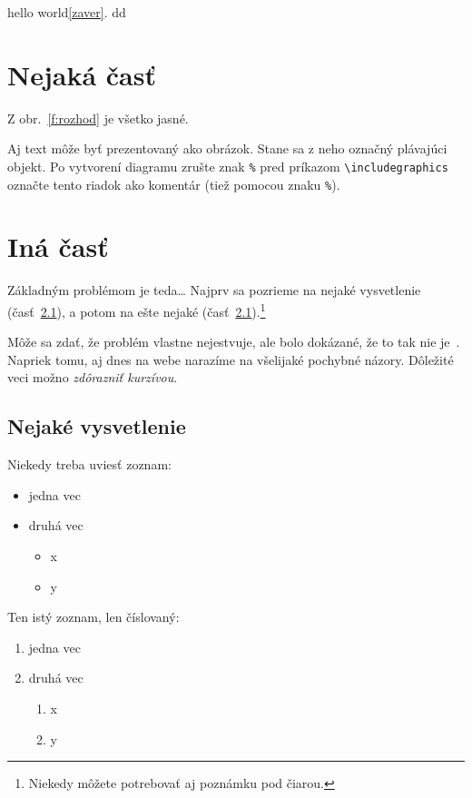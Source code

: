 \documentclass[10pt,twoside,slovak,a4paper]{coursepaper}
\begin{document}
hello world\ref{zaver}.
dd


\section{Nejaká časť} \label{nejaka}

Z obr.~\ref{f:rozhod} je všetko jasné. 

\begin{figure*}[tbh]
\centering
Aj text môže byť prezentovaný ako obrázok. Stane sa z neho označný plávajúci objekt. Po vytvorení diagramu zrušte znak \texttt{\%} pred príkazom \verb|\includegraphics| označte tento riadok ako komentár (tiež pomocou znaku \texttt{\%}).
\caption{Rozhodujúci argument.}
\label{f:rozhod}
\end{figure*}



\section{Iná časť} \label{ina}

Základným problémom je teda\ldots{} Najprv sa pozrieme na nejaké vysvetlenie (časť~\ref{ina:nejake}), a potom na ešte nejaké (časť~\ref{ina:nejake}).\footnote{Niekedy môžete potrebovať aj poznámku pod čiarou.}

Môže sa zdať, že problém vlastne nejestvuje\cite{Coplien:MPD}, ale bolo dokázané, že to tak nie je~\cite{Czarnecki:Staged, Czarnecki:Progress}. Napriek tomu, aj dnes na webe narazíme na všelijaké pochybné názory\cite{PLP-Framework}. Dôležité veci možno \emph{zdôrazniť kurzívou}.


\subsection{Nejaké vysvetlenie} \label{ina:nejake}

Niekedy treba uviesť zoznam:

\begin{itemize}
\item jedna vec
\item druhá vec
	\begin{itemize}
	\item x
	\item y
	\end{itemize}
\end{itemize}

Ten istý zoznam, len číslovaný:

\begin{enumerate}
\item jedna vec
\item druhá vec
	\begin{enumerate}
	\item x
	\item y
	\end{enumerate}
\end{enumerate}
\end{document}
